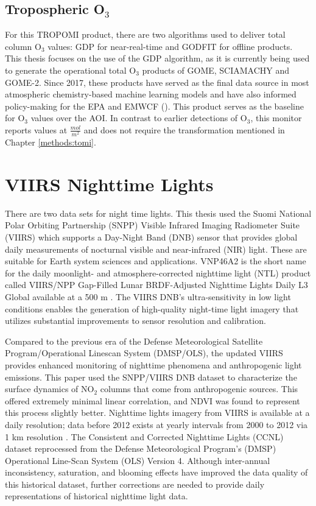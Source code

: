 \subsection{Tropospheric O$_3$} \label{tmas:S5Pozone} For this TROPOMI product, there are two algorithms used to deliver total column O$_3$ values: GDP for near-real-time and GODFIT for offline products. This thesis focuses on the use of the GDP algorithm, as it is currently being used to generate the operational total O$_3$ products of GOME, SCIAMACHY and GOME-2. Since 2017, these products have served as the final data source in most atmospheric chemistry-based machine learning models and have also informed policy-making for the EPA and EMWCF (\cite{schultz_tropospheric_2017}). This product serves as the baseline for O$_3$ values over the AOI. In contrast to earlier detections of O$_3$, this monitor reports values at $\frac{mol}{m^2}$ and does not require the transformation mentioned in Chapter \ref{methods:tomi}.
\section{VIIRS Nighttime Lights} \label{tmas:ntl} There are two data sets for night time lights. This thesis used the Suomi National Polar Orbiting Partnership (SNPP) Visible Infrared Imaging Radiometer Suite (VIIRS) which supports a Day-Night Band (DNB) sensor that provides global daily measurements of nocturnal visible and near-infrared (NIR) light. These are suitable for Earth system sciences and applications. VNP46A2 is the short name for the daily moonlight- and atmosphere-corrected nighttime light (NTL) product called VIIRS/NPP Gap-Filled Lunar BRDF-Adjusted Nighttime Lights Daily L3 Global available at a 500 m \parencite{roman2018}. The VIIRS DNB's ultra-sensitivity in low light conditions enables the generation of high-quality night-time light imagery that utilizes substantial improvements to sensor resolution and calibration. 

Compared to the previous era of the Defense Meteorological Satellite Program/Operational Linescan System (DMSP/OLS), the updated VIIRS provides enhanced monitoring of nighttime phenomena and anthropogenic light emissions. This paper used the SNPP/VIIRS DNB dataset to characterize the surface dynamics of NO$_2$ columns that come from anthropogenic sources. This offered extremely minimal linear correlation, and NDVI was found to represent this process slightly better. Nighttime lights imagery from VIIRS is available at a daily resolution; data before 2012 exists at yearly intervals from 2000 to 2012 via 1 km resolution \parencite{zhao2020}. The Consistent and Corrected Nighttime Lights (CCNL) dataset reprocessed from the Defense Meteorological Program's (DMSP) Operational Line-Scan System (OLS) Version 4. Although inter-annual inconsistency, saturation, and blooming effects have improved the data quality of this historical dataset, further corrections are needed to provide daily representations of historical nighttime light data.
